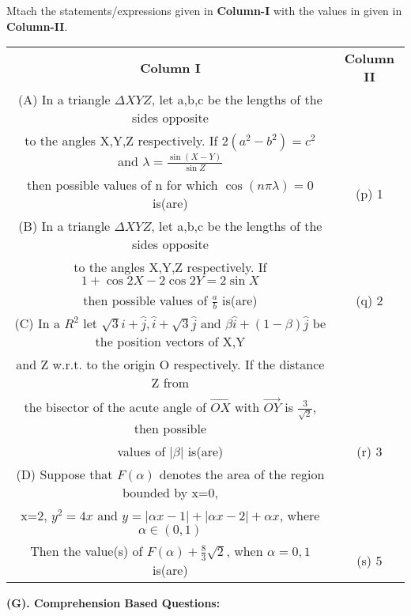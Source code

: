 \item Mtach the statements/expressions given in \textbf{Column-I} with the values in given in \textbf{Column-II}.
\begin{table}[ht!]
\centering
\begin{tabular}{c c} 
 \textbf{Column I} & \textbf{Column II}\\ [0.5ex] 
 (A) In a triangle $\Delta XYZ$, let a,b,c be the lengths of the sides opposite\\
     to the angles X,Y,Z respectively. If $2(a^2-b^2)=c^2$ and $\lambda=\frac{\sin(X-Y)}{\sin Z}$\\
     then possible values of n for which $\cos(n\pi\lambda)=0$ is(are)                              &(p) 1\\ 
 (B) In a triangle $\Delta XYZ$, let a,b,c be the lengths of the sides opposite\\
     to the angles X,Y,Z respectively. If $1+\cos2X-2\cos2Y=2\sin X$\\
     then possible values of $\frac{a}{b}$ is(are)                                                  &(q) 2\\
 (C) In a $R^2$ let $\sqrt{3}\hat{i}+\hat{j}, \hat{i}+\sqrt{3}\hat{j}$ and $\beta\hat{i}
     +(1-\beta)\hat{j}$ be the position vectors of X,Y\\ and Z w.r.t. to the origin O respectively.
     If the distance Z from\\ the bisector of the acute angle of $\overrightarrow{OX}$ with
     $\overrightarrow{OY}$ is $\frac{3}{\sqrt{2}}$, then possible\\ values of $|\beta|$ is(are)     &(r) 3\\
 (D) Suppose that $F(\alpha)$ denotes the area of the region bounded by x=0,\\
     x=2, $y^2=4x$ and $y=|\alpha x-1|+|\alpha x-2|+\alpha x$, where $\alpha \in (0,1)$\\
     Then the value(s) of $F(\alpha)+\frac{8}{3}\sqrt{2}$, when $\alpha =0, 1$ is(are)              &(s) 5\\[1ex]
                                                            
\end{tabular}
\end{table}
\clearpage

\textbf{(G). Comprehension Based Questions:}

